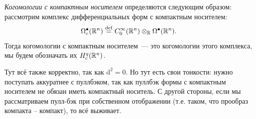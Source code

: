 	\begin{definition} 
		\emph{Когомологии с компактным носителем} определяются следующим образом: рассмотрим комплекс дифференциальных форм с компактным носителем: 
		\[
			\Omega_{c}^{\bullet}(\mathbb{R}^n) \stackrel{\mathrm{def}}{=} C^{\infty}_{0}(\mathbb{R}^n) \otimes_{\mathbb{R}} \Omega^{\bullet}(\mathbb{R}^n).
		\]
		Тогда когомологии с компактным носителем~--- это когомологии этого комплекса, мы будем обозначать их  $H^{q}_{c}(\mathbb{R}^n)$. 
	\end{definition}

	\begin{remark}
		Тут всё также корректно, так как $\mathrm{d}^2 = 0$. Но тут есть свои тонкости: нужно поступать аккуратнее с пуллбэком, так как пуллбэк формы с компактным носителем не обязан иметь компактный носитель. С другой стороны, если мы рассматриваем пулл-бэк при собственном отображении (т.е. таком, что прообраз компакта -- компакт), то всё выживает.  
	\end{remark}

